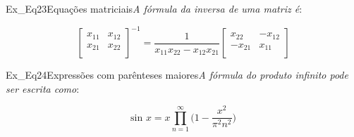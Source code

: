 \begin{texercise}{Ex_Eq23}{Equações matriciais}\textit{A fórmula da inversa de uma matriz é}:\par\smallskip%
\begin{tcboutputlisting}
    \begin{center}
        \begin{equation*}
            \begin{bmatrix}
                x_{11} & x_{12} \\
                x_{21} & x_{22} \\
            \end{bmatrix}^{-1} 
            = \frac{1}{x_{11}x_{22} - x_{12}x_{21}} 
            \begin{bmatrix}
                x_{22} & -x_{12}  \\
                -x_{21} &  x_{11} \\
            \end{bmatrix}
        \end{equation*}
    \end{center}
\end{tcboutputlisting}
\tcbuselistingtext%
\end{texercise}
  
\begin{texercise}{Ex_Eq24}{Expressões com parênteses maiores}\textit{A fórmula do produto infinito pode ser escrita como}:\par\smallskip%
\begin{tcboutputlisting}
    \begin{center}
        \begin{equation*}
            \text{sin }x = x \prod^{\infty}_{n=1} 
            \bigg(1 - \frac{x^2}{\pi^{2} n^{2}} \bigg)
        \end{equation*}
    \end{center}
\end{tcboutputlisting}
\tcbuselistingtext%
\end{texercise}

